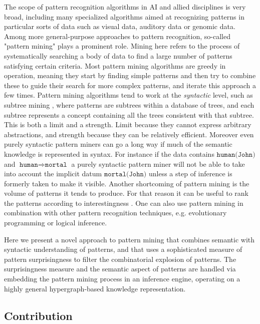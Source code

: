 \documentclass[runningheads]{llncs}
\begin{document}
The scope of pattern recognition algorithms in AI and allied
disciplines is very broad, including many specialized algorithms aimed
at recognizing patterns in particular sorts of data such as visual
data, auditory data or genomic data.  Among more general-purpose
approaches to pattern recognition, so-called "pattern mining" plays a
prominent role.  Mining here refers to the process of systematically
searching a body of data to find a large number of patterns satisfying
certain criteria.  Most pattern mining algorithms are greedy in
operation, meaning they start by finding simple patterns and then try
to combine these to guide their search for more complex patterns, and
iterate this approach a few times.  Pattern mining algorithms tend to
work at the \emph{syntactic} level, such as subtree mining
\cite{Chi2005Freq}, where patterns are subtrees within a database of
trees, and each subtree represents a concept containing all the trees
consistent with that subtree. This is both a limit and a
strength. Limit because they cannot express arbitrary abstractions,
and strength because they can be relatively efficient. Moreover even
purely syntactic pattern miners can go a long way if much of the
semantic knowledge is represented in syntax. For instance if the data
contains $\texttt{human(John)}$ and
$\texttt{human}\Rightarrow\texttt{mortal}$ a purely syntactic pattern
miner will not be able to take into account the implicit datum
$\texttt{mortal(John)}$ unless a step of inference is formerly taken
to make it visible.  Another shortcoming of pattern mining is the
volume of patterns it tends to produce. For that reason it can be
useful to rank the patterns according to interestingness
\cite{Vreeken2014}.  One can also use pattern mining in combination
with other pattern recognition techniques, e.g. evolutionary
programming or logical inference.

Here we present a novel approach to pattern mining that combines semantic
with syntactic understanding of patterns, and that uses a sophisticated
measure of pattern surprisingness to filter the combinatorial explosion of
patterns.   The surprisingness measure and the semantic aspect of patterns
are handled via embedding the pattern mining process in an inference engine,
operating on a highly general hypergraph-based knowledge representation.

\subsection{Contribution}
\end{document}
